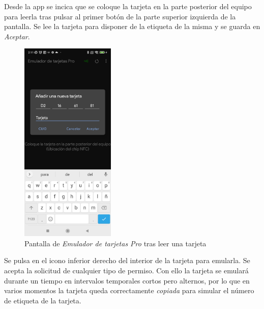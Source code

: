 \documentclass[12pt,a4paper,onecolumn,oneside]{report}
\begin{document}
Desde la app se incica que se coloque la tarjeta en la parte posterior del equipo para leerla tras pulsar al primer botón de la parte superior izquierda de la pantalla. Se lee la tarjeta para disponer de la etiqueta de la misma y se guarda en \textit{Aceptar}.


\begin{figure}[H] 
\centering
  \includegraphics[width=0.4\textwidth]{figuras/root7.png}
  \caption[Pantalla de \textit{Emulador de tarjetas Pro} tras leer una tarjeta]{Pantalla de \textit{Emulador de tarjetas Pro} tras leer una tarjeta\\
  }
  \label{fig:root7}
\end{figure}

Se pulsa en el icono inferior derecho del interior de la tarjeta para emularla. Se acepta la solicitud de cualquier tipo de permiso. Con ello la tarjeta se emulará durante un tiempo en intervalos temporales cortos pero alternos, por lo que en varios momentos la tarjeta queda correctamente \textit{copiada} para simular el número de etiqueta de la tarjeta.
\end{document}
